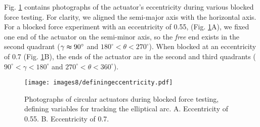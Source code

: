 Fig. \ref{fig:comparingeccentricity} contains photographs of the actuator's eccentricity during various blocked force testing. For clarity, we aligned the semi-major axis with the horizontal axis. For a blocked force experiment with an eccentricity of 0.55, (Fig. \ref{fig:comparingeccentricity}A), we fixed one end of the actuator on the semi-minor axis, so the \emph{free} end exists in the second quadrant ($\gamma\thickapprox90^\circ$ and $180^\circ<\theta<270^\circ$). When blocked at an eccentricity of 0.7 (Fig. \ref{fig:comparingeccentricity}B), the ends of the actuator are in the second and third quadrants ($90^\circ<\gamma<180^\circ$ and $270^\circ<\theta<360^\circ$). \\

\begin{figure}[!ht]
    \centering
     \texttt{[image: images8/definingeccentricity.pdf]}
    \caption{Photographs of circular actuators during blocked force testing, defining variables for tracking the elliptical arc. A. Eccentricity of 0.55. B. Eccentricity of 0.7.}
    \label{fig:comparingeccentricity}
\end{figure}
